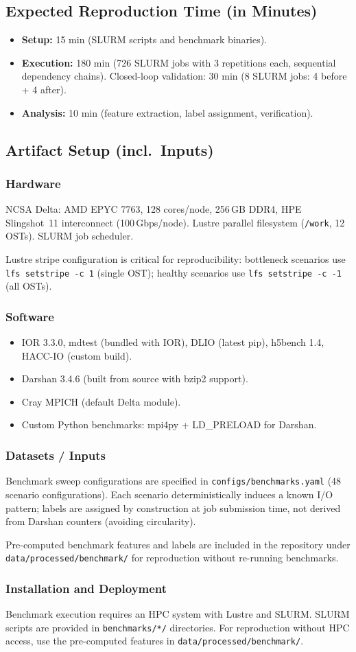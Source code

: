 \documentclass[conference]{IEEEtran}
\newcommand{\arttime}{\subsection*{Expected Reproduction Time (in Minutes)}}
\newcommand{\artin}{\subsection*{Artifact Setup (incl.\ Inputs)}}
\newcommand{\artinpart}[1]{\subsubsection*{#1}}
\begin{document}
\arttime
\begin{itemize}
\item \textbf{Setup:} 15 min (SLURM scripts and benchmark binaries).
\item \textbf{Execution:} 180 min (726 SLURM jobs with 3 repetitions
each, sequential dependency chains).
Closed-loop validation: 30 min (8 SLURM jobs: 4 before + 4 after).
\item \textbf{Analysis:} 10 min (feature extraction, label assignment,
verification).
\end{itemize}

\artin

\artinpart{Hardware}
NCSA Delta: AMD EPYC 7763, 128 cores/node, 256\,GB DDR4, HPE
Slingshot~11 interconnect (100\,Gbps/node). Lustre parallel filesystem
(\texttt{/work}, 12 OSTs). SLURM job scheduler.

Lustre stripe configuration is critical for reproducibility:
bottleneck scenarios use \texttt{lfs setstripe -c 1} (single OST);
healthy scenarios use \texttt{lfs setstripe -c -1} (all OSTs).

\artinpart{Software}
\begin{itemize}
\item IOR 3.3.0, mdtest (bundled with IOR), DLIO (latest pip),
h5bench 1.4, HACC-IO (custom build).
\item Darshan 3.4.6 (built from source with bzip2 support).
\item Cray MPICH (default Delta module).
\item Custom Python benchmarks: mpi4py + LD\_PRELOAD for Darshan.
\end{itemize}

\artinpart{Datasets / Inputs}
Benchmark sweep configurations are specified in
\texttt{configs/benchmarks.yaml} (48 scenario configurations).
Each scenario deterministically induces a known I/O pattern;
labels are assigned by construction at job submission time,
not derived from Darshan counters (avoiding circularity).

Pre-computed benchmark features and labels are included in the
repository under \texttt{data/processed/benchmark/} for
reproduction without re-running benchmarks.

\artinpart{Installation and Deployment}
Benchmark execution requires an HPC system with Lustre and SLURM.
SLURM scripts are provided in \texttt{benchmarks/*/} directories.
For reproduction without HPC access, use the pre-computed
features in \texttt{data/processed/benchmark/}.
\end{document}

